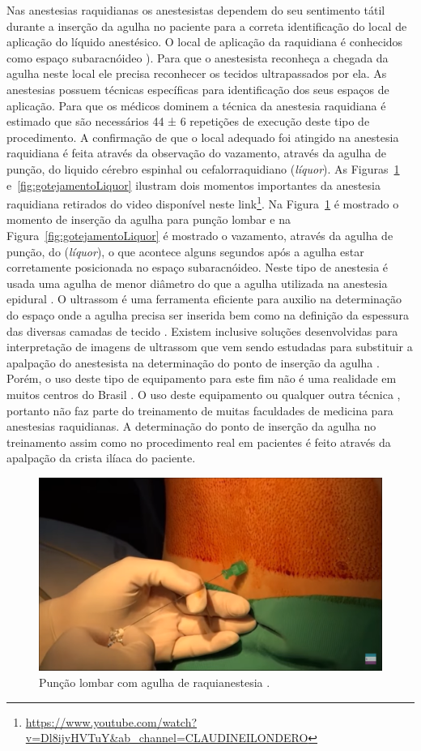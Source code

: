 Nas anestesias raquidianas os anestesistas dependem do seu sentimento tátil durante a inserção da agulha no paciente para a correta identificação do local de aplicação do líquido anestésico. O local de aplicação da raquidiana é conhecidos como espaço subaracnóideo \cite{Miller2009}). Para que o anestesista reconheça a chegada da agulha neste local ele precisa reconhecer os tecidos ultrapassados por ela. As anestesias possuem técnicas específicas para identificação dos seus espaços de aplicação. Para que os médicos dominem a técnica da anestesia raquidiana é estimado que são necessários 44 ± 6 repetições de execução deste tipo de procedimento. A confirmação de que o local adequado foi atingido na anestesia raquidiana é feita através da observação do vazamento, através da agulha de punção, do liquido cérebro espinhal ou cefalorraquidiano (\textit{líquor}). As Figuras~\ref{fig:puncaoLombar} e~\ref{fig:gotejamentoLiquor} ilustram dois momentos importantes da anestesia raquidiana retirados do video disponível neste link\footnote{\url{https://www.youtube.com/watch?v=Dl8ijvHVTuY&ab\_channel=CLAUDINEILONDERO}}. Na Figura~\ref{fig:puncaoLombar} é mostrado o momento de inserção da agulha para punção lombar e na Figura~\ref{fig:gotejamentoLiquor} é mostrado o vazamento, através da agulha de punção, do (\textit{líquor}), o que acontece alguns segundos após a agulha estar corretamente posicionada no espaço subaracnóideo. Neste tipo de anestesia é usada uma agulha de menor diâmetro do que a agulha utilizada na anestesia epidural \cite{Miller2009}. O ultrassom é uma ferramenta eficiente para auxilio na determinação do espaço onde a agulha precisa ser inserida \cite{Helayel2010, Soni2019} bem como na definição da espessura das diversas camadas de tecido \cite{Klingensmith2022}. Existem inclusive soluções desenvolvidas para interpretação de imagens de ultrassom que vem sendo estudadas para substituir a apalpação do anestesista na determinação do ponto de inserção da agulha \cite{Ni2021}. Porém, o uso deste tipo de equipamento para este fim não é uma realidade em muitos centros do Brasil \cite{Hamaji2016}. O uso deste equipamento ou qualquer outra técnica \cite{Berde2022}, portanto não faz parte do treinamento de muitas faculdades de medicina para anestesias raquidianas. A determinação do ponto de inserção da agulha no treinamento assim como no procedimento real em pacientes é feito através da apalpação da crista ilíaca do paciente.

\begin{figure}[!ht]
   \centering
   \includegraphics[width=0.6\linewidth]{capitulos/figuras/2.PuncaoLombar.png}
   \caption{Punção lombar com agulha de raquianestesia  \cite{Londero2018}.}
   \label{fig:puncaoLombar}
\end{figure}

